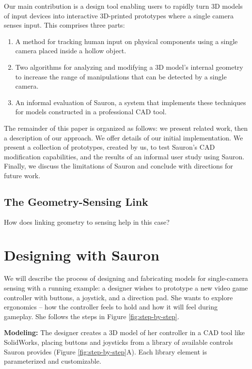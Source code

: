 Our main contribution is a design tool enabling users to rapidly turn 3D models of input devices into interactive 3D-printed prototypes where a single camera senses input. This comprises three parts:

\begin{enumerate}
\item A method for tracking human input on physical components using a single camera placed inside a hollow object.
\item Two algorithms for analyzing and modifying a 3D model's internal geometry to increase the range of manipulations that can be detected by a single camera.
\item An informal evaluation of Sauron, a system that implements these techniques for models constructed in a professional CAD tool.
\end{enumerate}

The remainder of this paper is organized as follows: we present related work, then a description of our approach. We offer details of our initial implementation.  We present a collection of prototypes, created by us, to test Sauron's CAD modification capabilities, and the results of an informal user study using Sauron.  Finally, we discuss the limitations of Sauron and conclude with directions for future work.

    \subsection{The Geometry-Sensing Link}
    How does linking geometry to sensing help in this case?

\section{Designing with Sauron}
    We will describe the process of designing and fabricating models for single-camera sensing with a running example: a designer wishes to prototype a new video game controller with buttons, a joystick, and a direction pad.  She wants to explore ergonomics -- how the controller feels to hold and how it will feel during gameplay.  She follows the steps in Figure \ref{fig:step-by-step}.


\textbf{Modeling:} The designer creates a 3D model of her controller in a CAD tool like SolidWorks, placing buttons and joysticks from a library of available controls Sauron provides (Figure \ref{fig:step-by-step}A). Each library element is parameterized and customizable.

